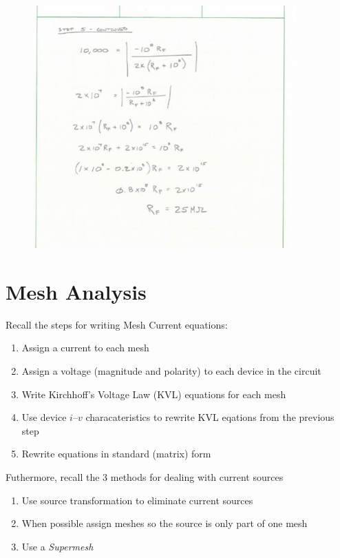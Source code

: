 \documentclass{handout}
\begin{document}
{%

\begin{figure}[h! t! b!]
\centering
\includegraphics[width=0.9\textwidth]{Example4solnC.jpg}
\end{figure}

}


\section{Mesh Analysis}
Recall the steps for writing Mesh Current equations:
\begin{enumerate}
\item Assign a current to each mesh
\item Assign a voltage (magnitude and polarity) to each device in the circuit
\item Write Kirchhoff's Voltage Law (KVL) equations for each mesh
\item Use device $i$--$v$ characateristics to rewrite KVL eqations from the previous step
\item Rewrite equations in standard (matrix) form
\end{enumerate}

Futhermore, recall the 3 methods for dealing with current sources
\begin{enumerate}
\item Use source transformation to eliminate current sources
\item When possible assign meshes so the source is only part of one mesh
\item Use a {\em Supermesh}
\end{enumerate}
\end{document}
